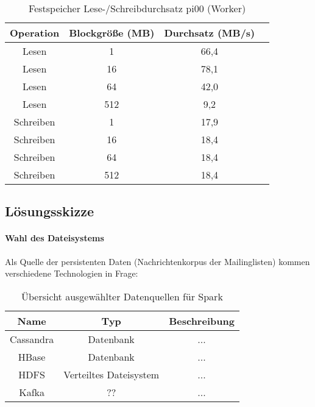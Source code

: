 \begin{table}[ht]
	\caption{Festspeicher Lese-/Schreibdurchsatz pi00 (Worker)} %
	\centering %
	\begin{tabular}{c c c c} %
	\hline\hline %
	Operation & Blockgröße (MB) & Durchsatz (MB/s) \\ [0.5ex] %
	\hline %
	Lesen & 1 & 66,4 \\ 
	Lesen & 16 & 78,1 \\
	Lesen & 64 & 42,0 \\
	Lesen & 512 & 9,2 \\
	Schreiben & 1 & 17,9 \\ 
	Schreiben & 16 & 18,4 \\
	Schreiben & 64 & 18,4 \\
	Schreiben & 512 & 18,4 \\[1ex] 
	\hline %
	\end{tabular}
	\label{table:worker_harddrive} %
\end{table}



\subsection{Lösungsskizze}

\paragraph{Wahl des Dateisystems}

Als Quelle der persistenten Daten (Nachrichtenkorpus der Mailinglisten) kommen verschiedene Technologien in Frage:

\begin{table}[ht]
	\caption{Übersicht ausgewählter Datenquellen für Spark} %
	\centering %
	\begin{tabular}{c c c} %
	\hline\hline %
	Name & Typ & Beschreibung\\ [0.5ex] %
	\hline %
	Cassandra & Datenbank & ...\\ %
	HBase & Datenbank & ...\\
	HDFS & Verteiltes Dateisystem & ...\\
	Kafka & ?? & ...\\
	\hline %
	\end{tabular}
	\label{table:dsources} %
\end{table}

